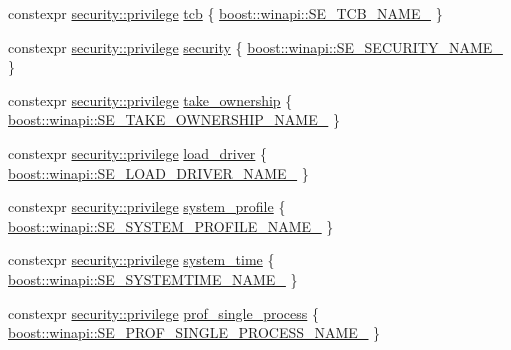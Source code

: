 \begin{DoxyCompactItemize}
\item 
constexpr \mbox{\hyperlink{classdistant_1_1security_1_1privilege}{security\+::privilege}} \mbox{\hyperlink{namespacedistant_1_1security_1_1privileges_ad42ad4716b88acb3557d2b5d67242124}{tcb}} \{ \mbox{\hyperlink{namespaceboost_1_1winapi_a622a9fe6dc31d22b90f2c1d3312fb9a9}{boost\+::winapi\+::\+S\+E\+\_\+\+T\+C\+B\+\_\+\+N\+A\+M\+E\+\_\+}} \}
\item 
constexpr \mbox{\hyperlink{classdistant_1_1security_1_1privilege}{security\+::privilege}} \mbox{\hyperlink{namespacedistant_1_1security_1_1privileges_a7e2035a0926a28efbcf53ca8ade90d65}{security}} \{ \mbox{\hyperlink{namespaceboost_1_1winapi_a66576e5eeb9dfbd001e31860c79b6b4a}{boost\+::winapi\+::\+S\+E\+\_\+\+S\+E\+C\+U\+R\+I\+T\+Y\+\_\+\+N\+A\+M\+E\+\_\+}} \}
\item 
constexpr \mbox{\hyperlink{classdistant_1_1security_1_1privilege}{security\+::privilege}} \mbox{\hyperlink{namespacedistant_1_1security_1_1privileges_abd45a410bde70cc4e405ca6dc19edbd3}{take\+\_\+ownership}} \{ \mbox{\hyperlink{namespaceboost_1_1winapi_a925c0b24f53e681487bb29ab033dabff}{boost\+::winapi\+::\+S\+E\+\_\+\+T\+A\+K\+E\+\_\+\+O\+W\+N\+E\+R\+S\+H\+I\+P\+\_\+\+N\+A\+M\+E\+\_\+}} \}
\item 
constexpr \mbox{\hyperlink{classdistant_1_1security_1_1privilege}{security\+::privilege}} \mbox{\hyperlink{namespacedistant_1_1security_1_1privileges_a899ab196eee73ece980c6be9f7e973d2}{load\+\_\+driver}} \{ \mbox{\hyperlink{namespaceboost_1_1winapi_a6717958568a079f5e3a9f1f6f23906b1}{boost\+::winapi\+::\+S\+E\+\_\+\+L\+O\+A\+D\+\_\+\+D\+R\+I\+V\+E\+R\+\_\+\+N\+A\+M\+E\+\_\+}} \}
\item 
constexpr \mbox{\hyperlink{classdistant_1_1security_1_1privilege}{security\+::privilege}} \mbox{\hyperlink{namespacedistant_1_1security_1_1privileges_ae5dcc8b9153fc5d5c239bf3618cd9ad5}{system\+\_\+profile}} \{ \mbox{\hyperlink{namespaceboost_1_1winapi_ace7945d1525332019ae9feffb1fd5d59}{boost\+::winapi\+::\+S\+E\+\_\+\+S\+Y\+S\+T\+E\+M\+\_\+\+P\+R\+O\+F\+I\+L\+E\+\_\+\+N\+A\+M\+E\+\_\+}} \}
\item 
constexpr \mbox{\hyperlink{classdistant_1_1security_1_1privilege}{security\+::privilege}} \mbox{\hyperlink{namespacedistant_1_1security_1_1privileges_ace0f3a3dd6a72c90cb329c036c923478}{system\+\_\+time}} \{ \mbox{\hyperlink{namespaceboost_1_1winapi_aaa97b22aec5300085cbd3261e22eaf05}{boost\+::winapi\+::\+S\+E\+\_\+\+S\+Y\+S\+T\+E\+M\+T\+I\+M\+E\+\_\+\+N\+A\+M\+E\+\_\+}} \}
\item 
constexpr \mbox{\hyperlink{classdistant_1_1security_1_1privilege}{security\+::privilege}} \mbox{\hyperlink{namespacedistant_1_1security_1_1privileges_a79cd2de4bed7dc24558f0e4180af9a9d}{prof\+\_\+single\+\_\+process}} \{ \mbox{\hyperlink{namespaceboost_1_1winapi_ad2afe2d90887ceb14d6f0317cadd0be0}{boost\+::winapi\+::\+S\+E\+\_\+\+P\+R\+O\+F\+\_\+\+S\+I\+N\+G\+L\+E\+\_\+\+P\+R\+O\+C\+E\+S\+S\+\_\+\+N\+A\+M\+E\+\_\+}} \}

\end{DoxyCompactItemize}
